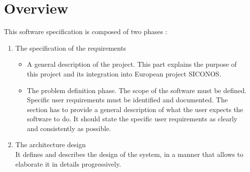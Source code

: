\section{Overview}
This software specification is composed of two phases :
\begin{enumerate}
\item The specification of the requirements
	\begin{itemize}
	\item A general description of the project. This part explains the purpose of this project and its integration into European project \ac{SICONOS}.
	\item The problem definition phase. The scope of the software must be defined. Specific user requirements must be identified and documented. The section has to provide a general description of what the user expects the software to do. It should state the specific user requirements as clearly and consistently as possible. 
	\end{itemize}
\item The architecture design\\
	It defines and describes the design of the system, in a manner that allows to elaborate it in details progressively. 
\end{enumerate}


